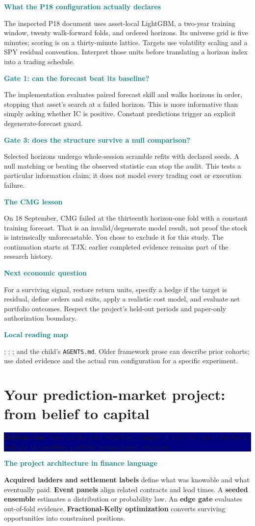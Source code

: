 \documentclass[10pt,letterpaper]{article}
\newcommand{\bl}[1]{\noindent\colorbox{navy}{\parbox{\dimexpr\linewidth-2\fboxsep}{\color{white}\textbf{Bottom line.} #1}}\par\medskip}
\newcommand{\topic}[2]{\clearpage\section{#1}\bl{#2}}
\newcommand{\sub}[1]{\par\textbf{\textcolor{teal}{#1}}\par}
\begin{document}
\sub{What the P18 configuration actually declares}
The inspected P18 document uses asset-local LightGBM, a two-year training window, twenty walk-forward folds, and ordered horizons. Its universe grid is five minutes; scoring is on a thirty-minute lattice. Targets use volatility scaling and a SPY residual convention. Interpret those units before translating a horizon index into a trading schedule.
\sub{Gate 1: can the forecast beat its baseline?}
The implementation evaluates paired forecast skill and walks horizons in order, stopping that asset's search at a failed horizon. This is more informative than simply asking whether IC is positive. Constant predictions trigger an explicit degenerate-forecast guard.
\sub{Gate 3: does the structure survive a null comparison?}
Selected horizons undergo whole-session scramble refits with declared seeds. A null matching or beating the observed statistic can stop the audit. This tests a particular information claim; it does not model every trading cost or execution failure.
\sub{The CMG lesson}
On 18 September, CMG failed at the thirteenth horizon-one fold with a constant training forecast. That is an invalid/degenerate model result, not proof the stock is intrinsically unforecastable. You chose to exclude it for this study. The continuation starts at TJX; earlier completed evidence remains part of the research history.
\sub{Next economic question}
For a surviving signal, restore return units, specify a hedge if the target is residual, define orders and exits, apply a realistic cost model, and evaluate net portfolio outcomes. Respect the project's held-out periods and paper-only authorization boundary.
\sub{Local reading map}
; ; ; and the child's \texttt{AGENTS.md}. Older framework prose can describe prior cohorts; use dated evidence and the actual run configuration for a specific experiment.
\topic{Your prediction-market project: from belief to capital}{Forecast the joint event law, compare it with the executable book, and size the resulting portfolio across shared outcomes.}
\sub{The project architecture in finance language}
\textbf{Acquired ladders and settlement labels} define what was knowable and what eventually paid. \textbf{Event panels} align related contracts and lead times. A \textbf{seeded ensemble} estimates a distribution or probability law. An \textbf{edge gate} evaluates out-of-fold evidence. \textbf{Fractional-Kelly optimization} converts surviving opportunities into constrained positions.
\end{document}
